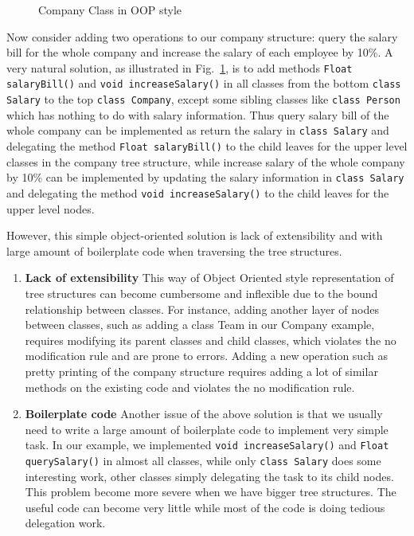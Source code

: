 \begin{figure}[tb]
\vspace{-.1in}
\caption{Company Class in OOP style}
\label{oop_company}
\end{figure}

Now consider adding two operations to our company structure: query the
salary bill for the whole company and increase the salary of each
employee by 10\%. A very natural solution, as illustrated in Fig.~\ref{oop_company}, is to add methods \lstinline{Float salaryBill()} and \lstinline{void increaseSalary()} in all classes from the bottom \lstinline{class Salary} to the top \lstinline{class Company}, except some sibling classes like \lstinline{class Person} which has nothing to do with salary information. Thus query salary bill of the whole company can be implemented as return the salary in \lstinline{class Salary} and delegating the method \lstinline{Float salaryBill()} to the child leaves for the upper level classes in the company tree structure, while increase salary of the whole company by 10\% can be implemented by updating the salary information in \lstinline{class Salary} and delegating the method \lstinline{void increaseSalary()} to the child leaves for the upper level nodes.  

However, this simple object-oriented solution is lack of extensibility and with large amount of boilerplate code when traversing the tree structures. 

\begin{enumerate}

\item {\bf Lack of extensibility} 
This way of Object Oriented style representation of tree structures can become cumbersome and inflexible due to the bound relationship between classes. For instance, adding another layer of nodes between classes, such as adding a class Team in our Company example, requires modifying its parent classes and child classes, which violates the no modification rule and are prone to errors. Adding a new operation such as pretty printing of the company structure requires adding a lot of similar methods on the existing code and violates the no modification rule.

\item {\bf Boilerplate code} 
Another issue of the above solution is that we usually need to write a large amount of boilerplate code to implement very simple task. In our example, we implemented \lstinline{void increaseSalary()} and \lstinline{Float querySalary()} in almost all classes, while only \lstinline{class Salary} does some interesting work, other classes simply delegating the task to its child nodes. This problem become more severe when we have bigger tree structures. The useful code can become very little while most of the code is doing tedious delegation work. 

\end{enumerate}


